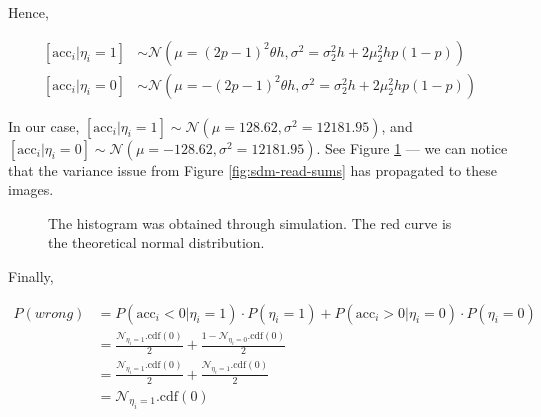 \documentclass[12pt]{article}
\begin{document}
Hence,

\begin{align}
\left[ \text{acc}_i|\eta_i=1 \right] &\sim \mathcal{N}(\mu = (2p-1)^2 \theta h, \sigma^2 = \sigma_2^2 h + 2 \mu_2^2 hp(1-p)) \label{eqn:sdm-eta1} \\
\left[ \text{acc}_i|\eta_i=0 \right] &\sim \mathcal{N}(\mu = -(2p-1)^2 \theta h, \sigma^2 = \sigma_2^2 h + 2 \mu_2^2 hp(1-p)) \label{eqn:sdm-eta0}
\end{align}

In our case, $\left[ \text{acc}_i|\eta_i=1 \right] \sim \mathcal{N}(\mu = 128.62, \sigma^2 = 12181.95)$, and $\left[ \text{acc}_i|\eta_i=0 \right] \sim \mathcal{N}(\mu = -128.62, \sigma^2 = 12181.95)$. See Figure \ref{fig:sdm-read} --- we can notice that the variance issue from Figure \ref{fig:sdm-read-sums} has propagated to these images.

\begin{figure}[h!]
  \centering

  \caption{The histogram was obtained through simulation. The red curve is the theoretical normal distribution.}
  \label{fig:sdm-read}
\end{figure}


Finally,

\begin{align}
P(wrong) &= P(\text{acc}_i < 0 | \eta_i = 1) \cdot P(\eta_i = 1) + P(\text{acc}_i > 0 | \eta_i = 0) \cdot P(\eta_i = 0) \\
    &= \frac{\mathcal{N}_{\eta_i=1}.\text{cdf}(0)}{2} + \frac{1-\mathcal{N}_{\eta_i=0}.\text{cdf}(0)}{2} \\
    &= \frac{\mathcal{N}_{\eta_i=1}.\text{cdf}(0)}{2} + \frac{\mathcal{N}_{\eta_i=1}.\text{cdf}(0)}{2} \\
    &= \mathcal{N}_{\eta_i=1}.\text{cdf}(0)
\end{align}
\end{document}
